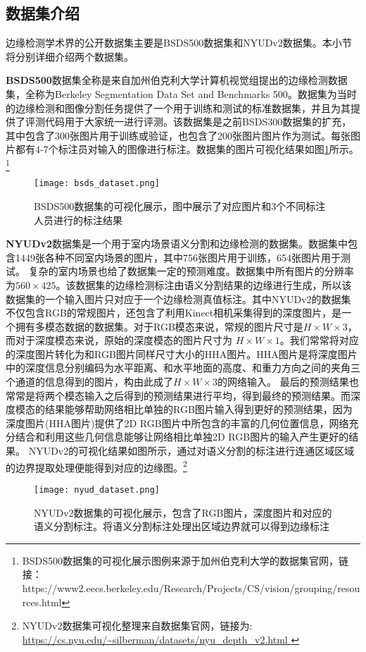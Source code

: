 \documentclass[master]{thesis-uestc}
\begin{document}
{\subsection{数据集介绍} 
边缘检测学术界的公开数据集主要是BSDS500数据集和NYUDv2数据集。本小节将分别详细介绍两个数据集。

\textbf{BSDS500}数据集全称是来自加州伯克利大学计算机视觉组提出的边缘检测数据集，全称为Berkeley Segmentation Data Set and Benchmarks 500。数据集为当时的边缘检测和图像分割任务提供了一个用于训练和测试的标准数据集，并且为其提供了评测代码用于大家统一进行评测。该数据集是之前BSDS300数据集的扩充，其中包含了300张图片用于训练或验证，也包含了200张图片图片作为测试。每张图片都有4-7个标注员对输入的图像进行标注。数据集的图片可视化结果如图\ref{bsds_dataset}所示。\footnote{BSDS500数据集的可视化展示图例来源于加州伯克利大学的数据集官网，链接：https://www2.eecs.berkeley.edu/Research/Projects/CS/vision/grouping/resources.html }
\begin{figure}[h!]
    \texttt{[image: bsds\_dataset.png]}
    \caption{BSDS500数据集的可视化展示，图中展示了对应图片和3个不同标注人员进行的标注结果}
    \label{bsds_dataset}
\end{figure}

\textbf{NYUDv2}数据集是一个用于室内场景语义分割和边缘检测的数据集。数据集中包含1449张各种不同室内场景的图片，其中756张图片用于训练，654张图片用于测试。 复杂的室内场景也给了数据集一定的预测难度。数据集中所有图片的分辨率为$560 \times 425$。该数据集的边缘检测标注由语义分割结果的边缘进行生成，所以该数据集的一个输入图片只对应于一个边缘检测真值标注。其中NYUDv2的数据集不仅包含RGB的常规图片，还包含了利用Kinect相机采集得到的深度图片，是一个拥有多模态数据的数据集。对于RGB模态来说，常规的图片尺寸是$H \times W \times  3$，而对于深度模态来说，原始的深度模态的图片尺寸为 $H \times W \times  1$。我们常常将对应的深度图片转化为和RGB图片同样尺寸大小的HHA图片。HHA图片是将深度图片中的深度信息分别编码为水平距离、和水平地面的高度、和重力方向之间的夹角三个通道的信息得到的图片，构由此成了$H \times W \times 3$的网络输入。 最后的预测结果也常常是将两个模态输入之后得到的预测结果进行平均，得到最终的预测结果。而深度模态的结果能够帮助网络相比单独的RGB图片输入得到更好的预测结果，因为深度图片(HHA图片)提供了2D RGB图片中所包含的丰富的几何位置信息，网络充分结合和利用这些几何信息能够让网络相比单独2D RGB图片的输入产生更好的结果。 NYUDv2的可视化结果如图所示，通过对语义分割的标注进行连通区域区域的边界提取处理便能得到对应的边缘图。\footnote{NYUDv2数据集可视化整理来自数据集官网，链接为: \url{https://cs.nyu.edu/~silberman/datasets/nyu_depth_v2.html }}
\begin{figure}[h!]
    \texttt{[image: nyud\_dataset.png]}
    \caption{NYUDv2数据集的可视化展示，包含了RGB图片，深度图片和对应的语义分割标注。将语义分割标注处理出区域边界就可以得到边缘标注}
    \label{nyud_dataset}
\end{figure}

}
\end{document}
